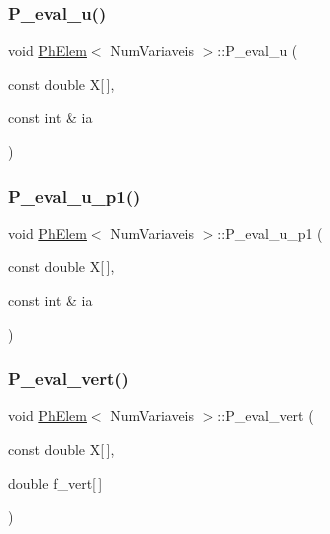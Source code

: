 \mbox{\label{classPhElem_aa648874799b8fa49fdccbcbc9b8de504}} 
\subsubsection{\texorpdfstring{P\+\_\+eval\+\_\+u()}{P\_eval\_u()}\hspace{0.1cm}{\footnotesize\ttfamily [2/2]}}
{\footnotesize\ttfamily void \hyperlink{classPhElem}{Ph\+Elem}$<$ Num\+Variaveis $>$\+::P\+\_\+eval\+\_\+u (\begin{DoxyParamCaption}\item[{const double}]{X\mbox{[}$\,$\mbox{]},  }\item[{const int \&}]{ia }\end{DoxyParamCaption})\hspace{0.3cm}{\ttfamily [inherited]}}

\mbox{\label{classPhElem_a69032d622789084c4416981e2fceb80c}} 
\subsubsection{\texorpdfstring{P\+\_\+eval\+\_\+u\+\_\+p1()}{P\_eval\_u\_p1()}}
{\footnotesize\ttfamily void \hyperlink{classPhElem}{Ph\+Elem}$<$ Num\+Variaveis $>$\+::P\+\_\+eval\+\_\+u\+\_\+p1 (\begin{DoxyParamCaption}\item[{const double}]{X\mbox{[}$\,$\mbox{]},  }\item[{const int \&}]{ia }\end{DoxyParamCaption})\hspace{0.3cm}{\ttfamily [inherited]}}

\mbox{\label{classPhElem_a115839e26aca8569ede2966db01926f1}} 
\subsubsection{\texorpdfstring{P\+\_\+eval\+\_\+vert()}{P\_eval\_vert()}}
{\footnotesize\ttfamily void \hyperlink{classPhElem}{Ph\+Elem}$<$ Num\+Variaveis $>$\+::P\+\_\+eval\+\_\+vert (\begin{DoxyParamCaption}\item[{const double}]{X\mbox{[}$\,$\mbox{]},  }\item[{double}]{f\+\_\+vert\mbox{[}$\,$\mbox{]} }\end{DoxyParamCaption})\hspace{0.3cm}{\ttfamily [inherited]}}

